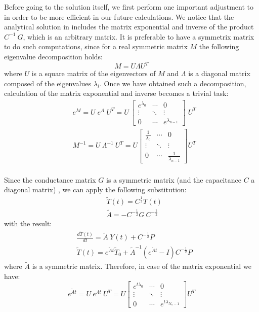 Before going to the solution itself, we first perform one important adjustment to  in order to be more efficient in our future calculations. We notice that the analytical solution in  includes the matrix exponential and inverse of the product $C^{-1} \: G$, which is an arbitrary matrix. It is preferable to have a symmetrix matrix to do such computations, since for a real symmetric matrix $M$ the following eigenvalue decomposition holds:
\begin{equation} \label{eq:eigenvalue-decomposition}
  M = U \Lambda U^T
\end{equation}
where $U$ is a square matrix of the eigenvectors of $M$ and $\Lambda$ is a diagonal matrix composed of the eigenvalues $\lambda_i$. Once we have obtained such a decomposition, calculation of the matrix exponential and inverse becomes a trivial task:
\begin{align*}
  & e^M = U \; e^{\Lambda} \; U^T = U \: \left[
      \begin{array}{ccc}
        e^{\lambda_0} & \cdots & 0 \\
        \vdots & \ddots & \vdots \\
        0 & \cdots & e^{\lambda_{n - 1}}
      \end{array}
    \right] \; U^T \\
  & M^{-1} = U \: \Lambda^{-1} \: U^T = U \left[
      \begin{array}{ccc}
        \frac{1}{\lambda_0} & \cdots & 0 \\
        \vdots & \ddots & \vdots \\
        0 & \cdots & \frac{1}{\lambda_{n - 1}}
      \end{array}
    \right] U^T \\
\end{align*}

Since the conductance matrix $G$ is a symmetric matrix (and the capacitance $C$ a diagonal matrix) \cite{rao2007}, we can apply the following substitution:
\begin{align*}
  & \tilde{T}(t) = C^{\frac{1}{2}} T(t) \\
  & \tilde{A} = -C^{-\frac{1}{2}} G \: C^{-\frac{1}{2}}
\end{align*}
with the result:
\begin{align*}
  & \frac{d\tilde{T}(t)}{dt} = \tilde{A} \: Y(t) + C^{-\frac{1}{2}} P \\
  & \tilde{T}(t) = e^{\tilde{A} t} \tilde{T}_0 + \tilde{A}^{-1} (e^{\tilde{A} t} - I) C^{-\frac{1}{2}} P
\end{align*}
where $\tilde{A}$ is a symmetric matrix. Therefore, in case of the matrix exponential we have:
\[
  e^{\tilde{A} t} = U \: e^{\Lambda t} \: U^T = U \left[
      \begin{array}{ccc}
        e^{t \lambda_0} & \cdots & 0 \\
        \vdots & \ddots & \vdots \\
        0 & \cdots & e^{t \lambda_{N_n - 1}}
      \end{array}
    \right] U^T
\]

